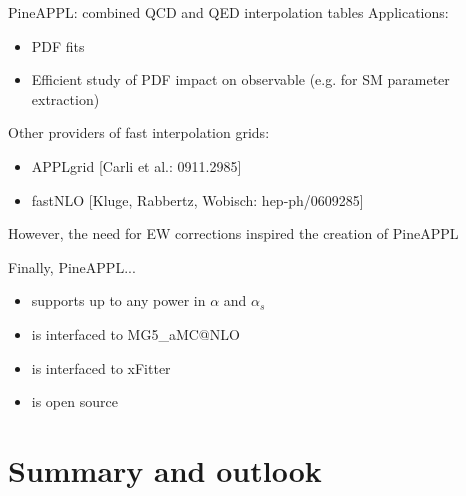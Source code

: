 \documentclass[aspectratio=169, 8pt,t]{beamer}
\begin{document}
\begin{frame}{PineAPPL: combined QCD and QED interpolation tables}
  Applications:
  \begin{itemize}
    \item PDF fits
    \item Efficient study of PDF impact on observable (e.g. for SM parameter extraction)
  \end{itemize}

  \vspace*{1em}
  Other providers of fast interpolation grids:
  \begin{itemize}
    \item APPLgrid {\color{gray}\small [Carli et al.: 0911.2985]}
    \item fastNLO {\color{gray}\small [Kluge, Rabbertz, Wobisch: hep-ph/0609285]}
  \end{itemize} 

  However, the need for EW corrections inspired the creation of PineAPPL
  
  \vspace*{1em}
  Finally, PineAPPL...
  \begin{itemize}
    \item supports up to any power in $\alpha$ and $\alpha_s$
    \item is interfaced to MG5\_aMC@NLO
    \item is interfaced to xFitter
    \item is open source
  \end{itemize}
\end{frame}



\section{Summary and outlook}
\end{document}
